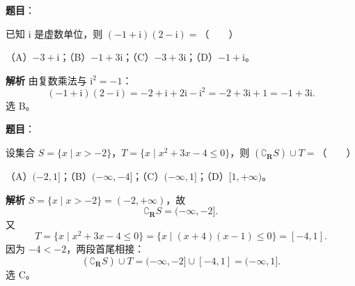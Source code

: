 

\begin{answer}

\textbf{题目}：

已知 $\mathrm i$ 是虚数单位，则 $(-1+\mathrm i)(2-\mathrm i)=$\mbox{（　　）}

（A）$-3+\mathrm i$；（B）$-1+3\mathrm i$；（C）$-3+3\mathrm i$；（D）$-1+\mathrm i$。

\textbf{解析}
由复数乘法与 $\mathrm i^2=-1$：
\nopagebreak[4]
\[(-1+\mathrm i)(2-\mathrm i)=-2+\mathrm i+2\mathrm i-\mathrm i^2=-2+3\mathrm i+1=-1+3\mathrm i.\]
选 B。


\end{answer}
\begin{answer}

\textbf{题目}：

设集合 $S=\{x\mid x>-2\}$，$T=\{x\mid x^2+3x-4\leqslant0\}$，则 $(\complement_{\mathbf R}S)\cup T=$\mbox{（　　）}

（A）$(-2,1]$；（B）$(-\infty,-4]$；（C）$(-\infty,1]$；（D）$[1,+\infty)$。

\textbf{解析}
$S=\{x\mid x>-2\}=(-2,+\infty)$，故
\nopagebreak[4]
\[\complement_{\mathbf R}S=(-\infty,-2].\]
又
\nopagebreak[4]
\[T=\{x\mid x^2+3x-4\leqslant0\}=\{x\mid(x+4)(x-1)\leqslant0\}=[-4,1].\]
因为 $-4<-2$，两段首尾相接：
\nopagebreak[4]
\[(\complement_{\mathbf R}S)\cup T=(-\infty,-2]\cup[-4,1]=(-\infty,1].\]
选 C。

\gkanswer{答案：C。$\complement_{\mathbf R}S=(-\infty,-2]$，$T=[-4,1]$，故并集为 $(-\infty,1]$。}

\end{answer}
